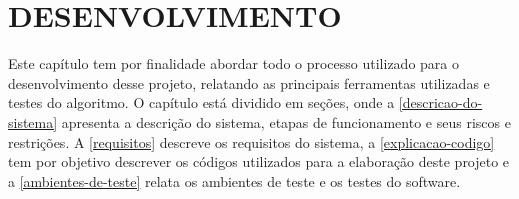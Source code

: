 \chapter{\textbf{DESENVOLVIMENTO}}
\label{desenvolvimento}


Este capítulo tem por finalidade abordar todo o processo utilizado para o desenvolvimento desse projeto, relatando as principais ferramentas utilizadas e testes do algoritmo. O capítulo está dividido em seções, onde a \autoref{descricao-do-sistema} apresenta a descrição do sistema, etapas de funcionamento e seus riscos e restrições. A \autoref{requisitos} descreve os requisitos do sistema, a \autoref{explicacao-codigo} tem por objetivo descrever os códigos utilizados para a elaboração deste projeto e a \autoref{ambientes-de-teste} relata os ambientes de teste e os testes do software.

%













